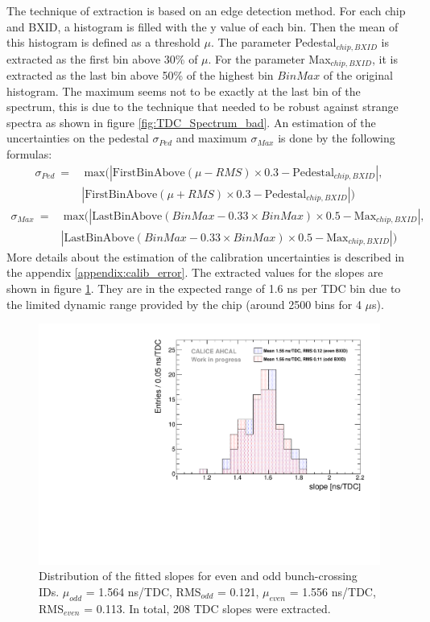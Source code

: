 The technique of extraction is based on an edge detection method. For each chip and BXID, a histogram is filled with the y value of each bin. Then the mean of this histogram is defined as a threshold $\mu$. The parameter Pedestal$_{chip, BXID}$ is extracted as the first bin above 30\% of $\mu$. For the parameter Max$_{chip, BXID}$, it is extracted as the last bin above 50\% of the highest bin $BinMax$ of the original histogram. The maximum seems not to be exactly at the last bin of the spectrum, this is due to the technique that needed to be robust against strange spectra as shown in figure \ref{fig:TDC_Spectrum_bad}.
An estimation of the uncertainties on the pedestal $\sigma_{Ped}$ and maximum $\sigma_{Max}$ is done by the following formulas:
\begin{equation} \label{eq:errorPed}
	\begin{aligned}
		\sigma_{Ped} \: = & \: \text{max}(\left|\text{FirstBinAbove}(\mu - RMS) \times 0.3 - \text{Pedestal}_{chip, BXID}\right|, \\
		& \left|\text{FirstBinAbove}(\mu + RMS) \times 0.3 - \text{Pedestal}_{chip, BXID}\right|)
	\end{aligned}
\end{equation}
\begin{equation} \label{eq:errorMax}
	\begin{aligned}
		\sigma_{Max} \: = & \: \text{max}(\left|\text{LastBinAbove}(BinMax - 0.33 \times BinMax) \times 0.5 - \text{Max}_{chip, BXID}\right|, \\
		& \left|\text{LastBinAbove}(BinMax - 0.33 \times BinMax) \times 0.5 - \text{Max}_{chip, BXID}\right|)
	\end{aligned}
\end{equation}
More details about the estimation of the calibration uncertainties is described in the appendix \ref{appendix:calib_error}. The extracted values for the slopes are shown in figure \ref{fig:slope_time}. They are in the expected range of 1.6 ns per TDC bin due to the limited dynamic range provided by the chip (around 2500 bins for 4 $\mu$s).

\begin{figure}[htbp!]
	\centering
	\includegraphics[width=0.7\linewidth]{../Thesis_Plots/Timing/Muons/Plots/SlopesTDC}
	\caption{Distribution of the fitted slopes for even and odd bunch-crossing IDs. $\mu_{odd}$ = 1.564 ns/TDC, RMS$_{odd}$ = 0.121, $\mu_{even}$ = 1.556 ns/TDC, RMS$_{even}$ = 0.113. In total, 208 TDC slopes were extracted.} \label{fig:slope_time}
\end{figure}

